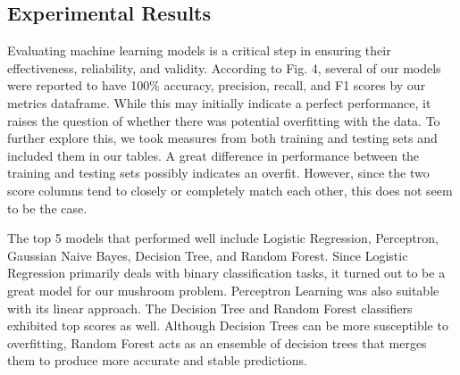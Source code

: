 \documentclass[11pt, conference]{IEEEtran}
\begin{document}
    \begin{figure}[htbp]
        \centering
    \end{figure}

    \subsection{Experimental Results}
    Evaluating machine learning models is a critical step in ensuring their effectiveness, reliability, and validity. According to Fig. 4, several of our models were reported to have 100\% accuracy, precision, recall, and F1 scores by our metrics dataframe. While this may initially indicate a perfect performance, it raises the question of whether there was potential overfitting with the data. To further explore this, we took measures from both training and testing sets and included them in our tables. A great difference in performance between the training and testing sets possibly indicates an overfit. However, since the two score columns tend to closely or completely match each other, this does not seem to be the case.
    
    The top 5 models that performed well include Logistic Regression, Perceptron, Gaussian Naive Bayes, Decision Tree, and Random Forest. Since Logistic Regression primarily deals with binary classification tasks, it turned out to be a great model for our mushroom problem. Perceptron Learning was also suitable with its linear approach. The Decision Tree and Random Forest classifiers exhibited top scores as well. Although Decision Trees can be more susceptible to overfitting, Random Forest acts as an ensemble of decision trees that merges them to produce more accurate and stable predictions. 
\end{document}
